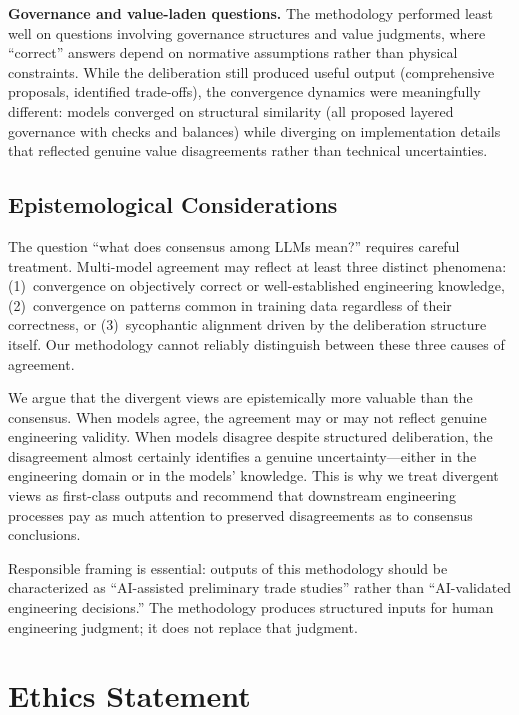 \documentclass[11pt,a4paper]{article}
\begin{document}
\textbf{Governance and value-laden questions.} The methodology performed least well on questions involving governance structures and value judgments, where ``correct'' answers depend on normative assumptions rather than physical constraints. While the deliberation still produced useful output (comprehensive proposals, identified trade-offs), the convergence dynamics were meaningfully different: models converged on structural similarity (all proposed layered governance with checks and balances) while diverging on implementation details that reflected genuine value disagreements rather than technical uncertainties.

\subsection{Epistemological Considerations}

The question ``what does consensus among LLMs mean?'' requires careful treatment. Multi-model agreement may reflect at least three distinct phenomena: (1)~convergence on objectively correct or well-established engineering knowledge, (2)~convergence on patterns common in training data regardless of their correctness, or (3)~sycophantic alignment driven by the deliberation structure itself. Our methodology cannot reliably distinguish between these three causes of agreement.

We argue that the divergent views are epistemically more valuable than the consensus. When models agree, the agreement may or may not reflect genuine engineering validity. When models disagree despite structured deliberation, the disagreement almost certainly identifies a genuine uncertainty---either in the engineering domain or in the models' knowledge. This is why we treat divergent views as first-class outputs and recommend that downstream engineering processes pay as much attention to preserved disagreements as to consensus conclusions.

Responsible framing is essential: outputs of this methodology should be characterized as ``AI-assisted preliminary trade studies'' rather than ``AI-validated engineering decisions.'' The methodology produces structured inputs for human engineering judgment; it does not replace that judgment.

\section{Ethics Statement}
\label{sec:ethics}
\end{document}
